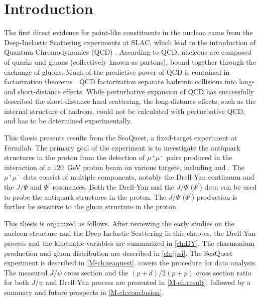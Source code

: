 \documentclass[../main.tex]{subfiles}
\begin{document}
\ifSubfilesClassLoaded{\mainmatter}{}

\chapter{Introduction}
\label{ch:intro}
The first direct evidence for point-like constituents in the nucleon came
from the Deep-Inelastic Scattering experiments at SLAC\cite{breidenbach1969},
which lead to the introduction of Quantum Chromodynamics (QCD) \cite{fritzsch1972,fritzsch1973}.
According to QCD, nucleons are composed of quarks and gluons (collectively known as partons),
bound together through the exchange of gluons. Much of the predictive power of QCD
is contained in factorization theorems \cite{collins1989}. QCD factorization separate
hadronic collisions into long- and short-distance effects. While perturbative expansion
of QCD has successfully described the short-distance hard scattering, the long-distance
effects, such as the internal structure of hadrons,
could not be calculated with perturbative QCD, and has to be determined experimentally.

This thesis presents results from the SeaQuest, a fixed-target experiment at Fermilab.
The primary goal of the experiment is to investigate the antiquark structures
in the proton from the detection of $\mu^+\mu^-$ pairs produced in
the interaction of a \SI{120}{\GeV} proton beam on various targets, including  and .
The $\mu^+\mu^-$ data consist of multiple components, notably the Drell-Yan continuum
and the  $J/\Psi$ and $\Psi^\prime$ resonances.
Both the Drell-Yan and the $J/\Psi$ ($\Psi^\prime$) data can be used to probe
the antiquark structures in the proton.
The $J/\Psi$ ($\Psi^\prime$) production is further be sensitive to the gluon structure in the proton.

This thesis is organized as follows. After reviewing the early studies
on the nucleon structure and the Deep-Inelastic Scattering in this chapter,
the Drell-Yan process and the kinematic variables are summarized in
\cref{ch:DY}. The charmonium production and gluon distribution are described
in \cref{ch:jpsi}. The SeaQuest experiment is described in \cref{M-ch:seaquest}.
 covers the procedure for data analysis. The measured $J/\psi$
cross section and the $(p+d)/2(p+p)$ cross section ratio for both $J/\psi$ and Drell-Yan process
are presented in \cref{M-ch:result}, followed by a summary and future prospects
in \cref{M-ch:conclusion}.
\end{document}

